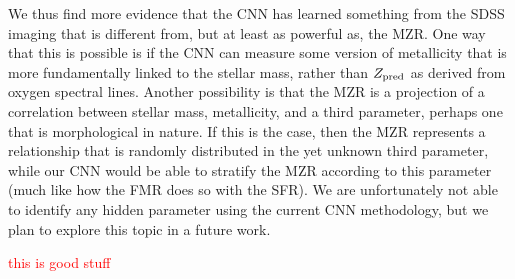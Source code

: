 \documentclass[fleqn,usenatbib]{mnras}
\newcommand{\editorial}[1]{\textcolor{red}{#1}}
\begin{document}
We thus find more evidence that the CNN has learned something from the SDSS \sdssi\sdssr\sdssg{} imaging that is different from, but at least as powerful as, the MZR. One way that this is possible is if the CNN can measure some version of metallicity that is more fundamentally linked to the stellar mass, rather than $Z_{\rm pred}$ as derived from oxygen spectral lines. Another possibility is that the MZR is a projection of a correlation between stellar mass, metallicity, and a third parameter, perhaps one that is morphological in nature. If this is the case, then the \cite{Tremonti2004} MZR represents a relationship that is randomly distributed in the yet unknown third parameter, while our CNN would be able to stratify the MZR according to this parameter (much like how the FMR does so with the SFR). We are unfortunately not able to identify any hidden parameter using the current CNN methodology, but we plan to explore this topic in a future work.

\editorial{this is good stuff}



%
\end{document}
